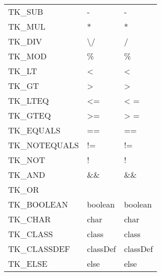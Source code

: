 \documentclass [a4paper,titlepage]{report}
\begin{document}
\begin{longtable}{l | l | l}
TK\_SUB              & -                                                                     & -                                 \tabularnewline
TK\_MUL              & *                                                                     & *                                 \tabularnewline
TK\_DIV              & \textbackslash{}/                                                     & /                                 \tabularnewline
TK\_MOD              & \%{}                                                                  & \%{}                              \tabularnewline
TK\_LT               & \textless{}                                                           & \textless{}                       \tabularnewline
TK\_GT               & \textgreater{}                                                        & \textgreater{}                    \tabularnewline
TK\_LTEQ             & \textless{}=                                                          & \textless{} =                     \tabularnewline
TK\_GTEQ             & \textgreater{}=                                                       & \textgreater{} =                  \tabularnewline
TK\_EQUALS           & ==                                                                    & ==                                \tabularnewline
TK\_NOTEQUALS        & !=                                                                    & !=                                \tabularnewline
TK\_NOT              & !                                                                     & !                                 \tabularnewline
TK\_AND              & \&{}\&{}                                                              & \&{}\&{}                          \tabularnewline
TK\_OR               & \textbar{}\textbar{}                                                  & \textbar{}\textbar{}              \tabularnewline
TK\_BOOLEAN          & boolean                                                               & boolean                           \tabularnewline
TK\_CHAR             & char                                                                  & char                              \tabularnewline
TK\_CLASS            & class                                                                 & class                             \tabularnewline
TK\_CLASSDEF         & classDef                                                              & classDef                          \tabularnewline
TK\_ELSE             & else                                                                  & else                              \tabularnewline

\end{longtable}
\end{document}
